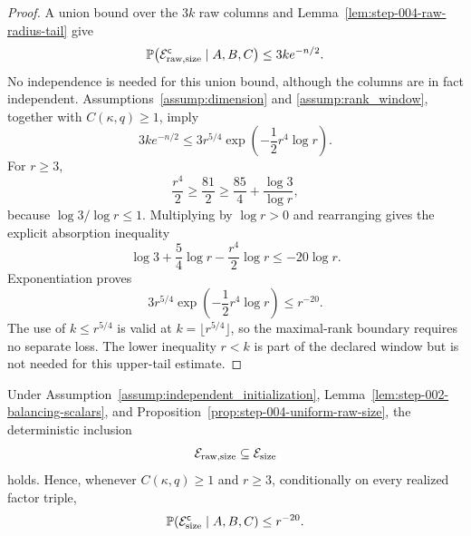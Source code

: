 \begin{proof}
A union bound over the \(3k\) raw columns and
Lemma~\ref{lem:step-004-raw-radius-tail} give
\[
  \mathbb P\!\left(\mathcal E_{\rm raw,size}^{\mathsf c}
      \mid A,B,C\right)
  \le 3k e^{-n/2}.
\]
No independence is needed for this union bound, although the columns are in
fact independent. Assumptions~\ref{assump:dimension} and
\ref{assump:rank_window}, together with \(C(\kappa,q)\ge1\), imply
\[
  3k e^{-n/2}
  \le 3r^{5/4}
       \exp\!\left(-\frac12r^4\log r\right).
\]
For \(r\ge3\),
\[
  \frac{r^4}{2}
  \ge \frac{81}{2}
  \ge \frac{85}{4}+\frac{\log3}{\log r},
\]
because \(\log3/\log r\le1\). Multiplying by \(\log r>0\) and rearranging
gives the explicit absorption inequality
\[
  \log3+\frac54\log r-\frac{r^4}{2}\log r
  \le -20\log r.
\]
Exponentiation proves
\[
  3r^{5/4}\exp\!\left(-\frac12r^4\log r\right)
  \le r^{-20}.
\]
The use of \(k\le r^{5/4}\) is valid at
\(k=\lfloor r^{5/4}\rfloor\), so the maximal-rank boundary requires no
separate loss. The lower inequality \(r<k\) is part of the declared window
but is not needed for this upper-tail estimate. 

\end{proof}


\begin{proposition}
\label{prop:step-004-balanced-size-transfer}
\leavevmode\par\noindent
Under Assumption~\ref{assump:independent_initialization},
Lemma~\ref{lem:step-002-balancing-scalars}, and
Proposition~\ref{prop:step-004-uniform-raw-size}, the deterministic inclusion
\[
  \mathcal E_{\rm raw,size}\subseteq\mathcal E_{\rm size}
\]
holds. Hence, whenever \(C(\kappa,q)\ge1\) and \(r\ge3\), conditionally on
every realized factor triple,
\[
  \mathbb P\!\left(\mathcal E_{\rm size}^{\mathsf c}
    \mid A,B,C\right)\le r^{-20}.
\]

\end{proposition}

